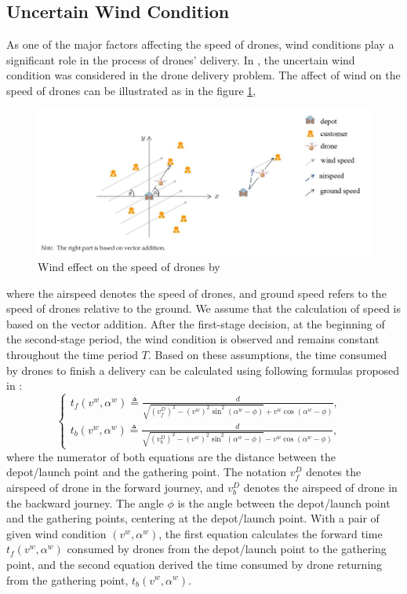 \documentclass[preprint,review,11pt,authoryear]{elsarticle}
\begin{document}
\subsection{Uncertain Wind Condition} \label{subsec:UncertainWindCondition}
As one of the major factors affecting the speed of drones, wind conditions play a significant role in the process of drones' delivery. In \cite{cheng2024robust}, the uncertain wind condition was considered in the drone delivery problem. The affect of wind on the speed of drones can be illustrated as in the figure \ref{fig:WindEffect},
\begin{figure}[h]
    \centering
    \includegraphics[width=0.7\linewidth]{figure_windspeed.png}
    \caption{Wind effect on the speed of drones by \cite{cheng2024robust}}
    \label{fig:WindEffect}
\end{figure}
where the airspeed denotes the speed of drones, and ground speed refers to the speed of drones relative to the ground. We assume that the calculation of speed is based on the vector addition. After the first-stage decision, at the beginning of the second-stage period, the wind condition is observed and remains constant throughout the time period $T$. Based on these assumptions, the time consumed by drones to finish a delivery can be calculated using following formulas proposed in \cite{cheng2024robust}:
\begin{equation}
    \begin{cases}
        t_f(v^{w}, \alpha^{w}) \triangleq \frac{d}{\sqrt{\left(v_f^{D}\right)^2 - \left(v^{w}\right)^2 \sin^2 \left( \alpha^{w} - \phi \right)} + v^{w} \cos \left( \alpha^{w}-\phi \right)} ,&\\
        t_b(v^{w}, \alpha^{w}) \triangleq \frac{d}{\sqrt{\left(v_b^{D}\right)^2 - \left(v^{w}\right)^2 \sin^2 \left( \alpha^{w} - \phi \right)} - v^{w} \cos \left( \alpha^{w}-\phi \right)} ,&
    \end{cases} \label{eq:time_wind}
\end{equation}
where the numerator of both equations are the distance between the depot/launch point and the gathering point. The notation $v_f^D$ denotes the airspeed of drone in the forward journey, and $v_b^D$ denotes the airspeed of drone in the backward journey. The angle $\phi$ is the angle between the depot/launch point and the gathering points, centering at the depot/launch point. With a pair of given wind condition $(v^{w}, \alpha^{w})$, the first equation calculates the forward time $t_f(v^{w}, \alpha^{w})$ consumed by drones from the depot/launch point to the gathering point, and the second equation derived the time consumed by drone returning from the gathering point, $t_b(v^{w}, \alpha^{w})$. 
\end{document}
